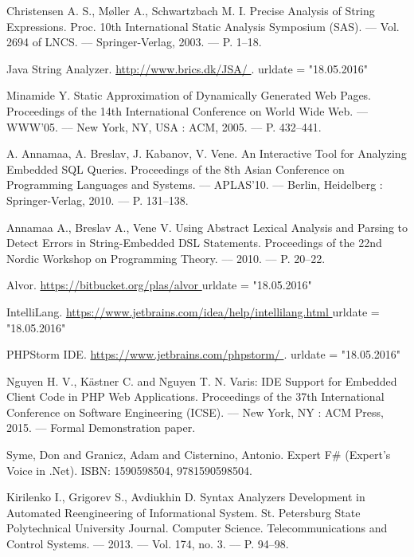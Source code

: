 \begin{thebibliography}{99}

  Christensen A. S., Møller A., Schwartzbach M. I. 
  Precise Analysis of String Expressions. 
  Proc. 10th International Static Analysis Symposium (SAS). –– Vol. 2694 of LNCS. –– Springer-Verlag, 2003. –– P. 1–18.

  Java String Analyzer.
  \url{ http://www.brics.dk/JSA/ }.
  urldate      = "18.05.2016"
                            
  Minamide Y. 
  Static Approximation of Dynamically Generated Web Pages.
  Proceedings of the 14th International Conference on World Wide Web. –– WWW’05. –– New York, NY, USA : ACM, 2005. –– P. 432–441.

  A. Annamaa, A. Breslav, J. Kabanov, V. Vene.
  An Interactive Tool for Analyzing Embedded SQL Queries.
  Proceedings of the 8th Asian Conference on Programming Languages and Systems. –– APLAS’10. –– Berlin, Heidelberg : Springer-Verlag, 2010. –– P. 131–138.

  Annamaa A., Breslav A., Vene V.
  Using Abstract Lexical Analysis and Parsing to Detect Errors in String-Embedded DSL Statements.
  Proceedings of the 22nd Nordic Workshop on Programming Theory. –– 2010. –– P. 20–22.

  Alvor.
  \url{ https://bitbucket.org/plas/alvor }
  urldate = "18.05.2016"

  IntelliLang.
  \url{ https://www.jetbrains.com/idea/help/intellilang.html }
  urldate = "18.05.2016"

  PHPStorm IDE.
  \url{ https://www.jetbrains.com/phpstorm/ }.
  urldate = "18.05.2016"

  Nguyen H. V., K{\"a}stner C. and Nguyen T. N.
  Varis: IDE Support for Embedded Client Code in PHP Web Applications.
  Proceedings of the 37th International Conference on Software Engineering (ICSE). –– New York, NY : ACM Press, 2015. –– Formal Demonstration paper.

  Syme, Don and Granicz, Adam and Cisternino, Antonio.
  Expert F\# (Expert's Voice in .Net).
  ISBN: 1590598504, 9781590598504.

  Kirilenko I., Grigorev S., Avdiukhin D. 
  Syntax Analyzers Development in Automated Reengineering of Informational System.
  St. Petersburg State Polytechnical University Journal. Computer Science. Telecommunications and Control Systems. –– 2013. –– Vol. 174, no. 3. –– P. 94–98.


\end{thebibliography}
